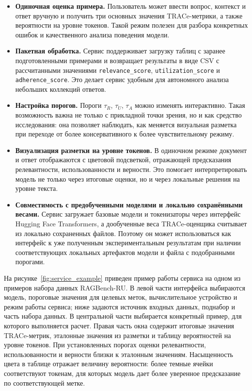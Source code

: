 \begin{itemize}
  \item \textbf{Одиночная оценка примера.}
  Пользователь может ввести вопрос, контекст и ответ вручную и получить три основных
  значения TRACe-метрики, а также вероятности на уровне токенов. Такой режим полезен для разбора
  конкретных ошибок и качественного анализа поведения модели.

  \item \textbf{Пакетная обработка.}
  Сервис поддерживает загрузку таблиц с заранее подготовленными примерами и возвращает
  результаты в виде CSV с рассчитанными значениями
  \texttt{relevance\_score}, \texttt{utilization\_score} и
  \texttt{adherence\_score}. Это делает сервис удобным для автономного анализа небольших
  коллекций ответов.

  \item \textbf{Настройка порогов.}
  Пороги $\tau_R$, $\tau_U$, $\tau_A$ можно изменять интерактивно. Такая возможность
  важна не только с прикладной точки зрения, но и как средство исследования: она
  позволяет наблюдать, как меняется визуальная разметка при переходе от более
  консервативного к более чувствительному режиму.

  \item \textbf{Визуализация разметки на уровне токенов.}
  В одиночном режиме документ и ответ отображаются с цветовой подсветкой, отражающей
  предсказания релевантности, использованности и верности. Это помогает интерпретировать модель
  не только через итоговые оценки, но и через локальные решения на уровне текста.

  \item \textbf{Совместимость с предобученными моделями и локально сохранёнными весами.}
  Сервис загружает базовые модели и токенизаторы через интерфейс Hugging Face
  Transformers, а дообученные веса TRACe-оценщика считывает из локально сохраненных
  файлов. Поэтому он может использоваться как интерфейс к уже полученным
  экспериментальным результатам при наличии соответствующих локальных артефактов
  модели и файла с подобранными порогами.


\end{itemize}

На рисунке~\ref{fig:service_example} приведен пример работы сервиса на одном из
примеров набора данных RAGBench-RU. В левой части интерфейса выбираются модель,
пороговые значения для целевых меток, вычислительное устройство и режим работы
сервиса; ниже задаются источник входных данных, поднабор и часть набора данных.
В центральной части выбирается конкретный пример, для которого выполняется
расчет. Правая часть окна содержит итоговые значения TRACe-метрик, эталонные
значения из разметки и таблицу вероятностей на уровне токенов. При установленных
порогах оценки релевантности, использованности и верности близки к эталонным
значениям. Насыщенность цвета в таблице отражает величину вероятности: более
темные ячейки соответствуют токенам, для которых модель дает более уверенное
предсказание по соответствующей метке.

